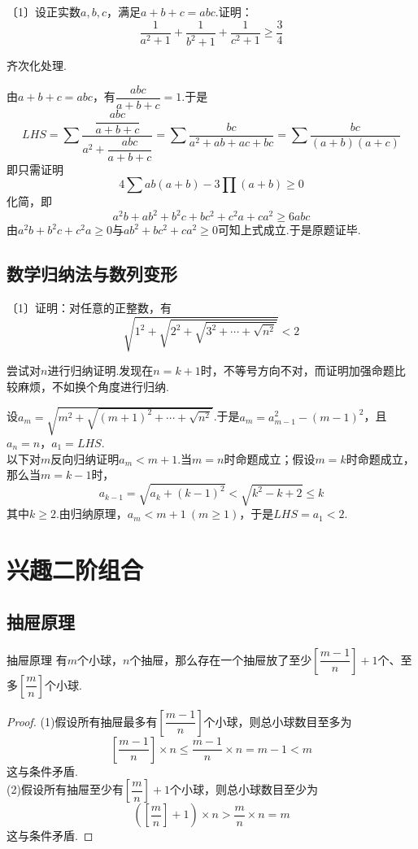 \documentclass[cn,hazy,black,10pt,normal]{elegantnote}
\newcommand{\nd}[1]{〔#1〕}
\newcommand{\ssb}[1]{\left( #1 \right)}
\begin{document}
\begin{problem} %
	\nd{1}设正实数$a,b,c$，满足$a+b+c=abc$.证明：$$\frac{1}{a^2+1} + \frac{1}{b^2+1} + \frac{1}{c^2+1} \geq \frac{3}{4}$$
\end{problem}
\begin{hint}
	齐次化处理.
\end{hint}
\begin{solution}
	由$a+b+c=abc$，有$\dfrac{abc}{a+b+c}=1$.于是$$LHS = \sum \frac{\dfrac{abc}{a+b+c}}{a^2 + \dfrac{abc}{a+b+c}} = \sum \frac{bc}{a^2+ab+ac+bc} = \sum \frac{bc}{(a+b)(a+c)}$$
	即只需证明$$4\sum ab(a+b) - 3\prod (a+b) \geq 0$$
	化简，即$$a^2b+ab^2+b^2c+bc^2+c^2a+ca^2 \geq 6abc$$
	由$a^2b+b^2c+c^2a \geq 0$与$ab^2+bc^2+ca^2 \geq 0$可知上式成立.于是原题证毕.
\end{solution}

\section{数学归纳法与数列变形}

\begin{problem} %
	\nd{1}证明：对任意的正整数，有$$\sqrt{1^2+ \sqrt{2^2+ \sqrt{3^2+ \cdots + \sqrt{n^2}}}}<2$$
\end{problem}
\begin{hint}
	尝试对$n$进行归纳证明.发现在$n=k+1$时，不等号方向不对，而证明加强命题比较麻烦，不如换个角度进行归纳.
\end{hint}
\begin{solution}
	设$a_m = \sqrt{m^2+\sqrt{(m+1)^2 + \cdots + \sqrt{n^2}}}$.于是$a_m=a_{m-1}^2-(m-1)^2$，且$a_n=n$，$a_1=LHS$. \\
	以下对$m$反向归纳证明$a_m<m+1$.当$m=n$时命题成立；假设$m=k$时命题成立，那么当$m=k-1$时，$$a_{k-1} = \sqrt{a_k + (k-1)^2} < \sqrt{k^2-k+2} \leq k$$
	其中$k \geq 2$.由归纳原理，$a_m<m+1~(m \geq 1)$，于是$LHS=a_1 <2$.
\end{solution}




\chapter{兴趣二阶组合}

\section{抽屉原理}

\begin{theorem}{抽屉原理}
	有$m$个小球，$n$个抽屉，那么存在一个抽屉放了至少$\left[ \dfrac{m-1}{n} \right]+1$个、至多$\left[ \dfrac{m}{n} \right]$个小球.
\end{theorem}
\begin{proof}
	(1)假设所有抽屉最多有$\left[ \dfrac{m-1}{n} \right]$个小球，则总小球数目至多为$$\left[ \frac{m-1}{n} \right] \times n \leq \frac{m-1}{n} \times n = m-1 < m$$
	这与条件矛盾. \\
	(2)假设所有抽屉至少有$\left[ \dfrac{m}{n} \right] + 1$个小球，则总小球数目至少为$$\ssb{\left[ \dfrac{m}{n} \right] + 1} \times n > \frac{m}{n} \times n = m$$
	这与条件矛盾.
\end{proof}
\end{document}
